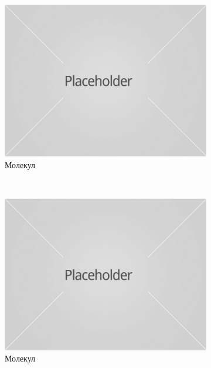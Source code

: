 \documentclass{report}
\theoremstyle{plain}
\theoremstyle{definition}
\begin{document}
\begin{figure}[h]
\centering
\begin{subfigure}{0.3\textwidth}
\includegraphics[width=\textwidth]{placeholder}
\caption{Молекул}
\end{subfigure}
~
\begin{subfigure}{0.3\textwidth}
\includegraphics[width=\textwidth]{placeholder}
\caption{Молекул}
\end{subfigure}
~
\begin{subfigure}{0.3\textwidth}

\end{subfigure}
\end{figure}
\end{document}
